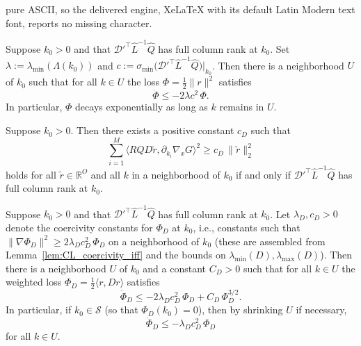 \documentclass[10pt,a4paper]{amsart}
\begin{document}
pure ASCII, so the delivered engine, XeLaTeX with its default Latin Modern text font, reports no missing character.
\begin{theorem}[Coercivity of EP]
\label{thm:EP_coercivity}
    Suppose $k_0>0$ and that $\mathscr{D}'^\top\hat{L}^{-1}\hat{Q}$ has full column rank at $k_0$. Set $\lambda := \lambda_{\min}(\Lambda(k_0))$ and $c := \sigma_{\min}\bigl(\mathscr{D}'^\top\hat{L}^{-1}\hat{Q}\bigr)\big|_{k_0}$. Then there is a neighborhood $U$ of $k_0$ such that for all $k \in U$ the loss $\Phi = \frac{1}{2}\|r\|^2$ satisfies
\begin{equation}
    \dot{\Phi} \leq -2\lambda c^2\,\Phi.
\end{equation}
In particular, $\Phi$ decays exponentially as long as $k$ remains in $U$.
\end{theorem}

\begin{lemma}
\label{lem:CL_coercivity_iff}
Suppose $k_0>0$. Then there exists a positive constant $c_D$ such that
\[
\sum_{i=1}^M\big\langle R Q D\tilde{r},\partial_{k_i}\nabla_x G\big\rangle^2 \geq c_D\,\|\tilde{r}\|_2^2
\]
holds for all $\tilde{r} \in \mathbb{R}^O$ and all $k$ in a neighborhood of $k_0$ if and only if $\mathscr{D}'^\top\hat{L}^{-1}\hat{Q}$ has full column rank at $k_0$.
\end{lemma}

\begin{theorem}[Coercivity of CL]
\label{thm:CL_coercivity}
    Suppose $k_0>0$ and that $\mathscr{D}'^\top\hat{L}^{-1}\hat{Q}$ has full column rank at $k_0$. Let $\lambda_D, c_D > 0$ denote the coercivity constants for $\Phi_D$ at $k_0$, i.e., constants such that $\|\nabla\Phi_D\|^2 \ge 2\lambda_D c_D^2\,\Phi_D$ on a neighborhood of $k_0$ (these are assembled from Lemma~\ref{lem:CL_coercivity_iff} and the bounds on $\lambda_{\min}(D), \lambda_{\max}(D)$). Then there is a neighborhood $U$ of $k_0$ and a constant $C_D > 0$ such that for all $k \in U$ the weighted loss $\Phi_D = \frac{1}{2}\langle r, Dr\rangle$ satisfies
\begin{equation}
    \dot{\Phi}_D  \leq -2\lambda_D c_D^2\,\Phi_D + C_D\,\Phi_D^{3/2}.
\end{equation}
In particular, if $k_0 \in \mathcal{S}$ (so that $\Phi_D(k_0) = 0$), then by shrinking $U$ if necessary,
\begin{equation}
    \dot{\Phi}_D \leq -\lambda_D c_D^2\,\Phi_D
\end{equation}
for all $k \in U$.
\end{theorem}
\end{document}
